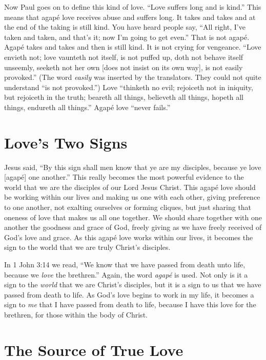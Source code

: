 Now Paul goes on to define this kind of love. “Love suffers long and is kind.” This means that agapé love receives 
abuse and suffers long. It takes and takes and at the end 
of the taking is still kind. You have heard people say, “All 
right, I’ve taken and taken, and that’s it; now I’m going 
to get even.” That is not agapé. Agapé takes and takes 
and then is still kind. It is not crying for vengeance. “Love 
envieth not; love vaunteth not itself, is not puffed up, doth 
not behave itself unseemly, seeketh not her own [does not 
insist on its own way], is not easily provoked.” (The word 
\emph{easily} was inserted by the translators. They could not quite 
understand “is not provoked.”) Love “thinketh no evil; 
rejoiceth not in iniquity, but rejoiceth in the truth; beareth all 
things, believeth all things, hopeth all things, endureth all 
things.” Agapé love “never fails.”


\section*{Love's Two Signs}

Jesus said, “By this sign shall men know that ye are my 
disciples, because ye love [agapé] one another.” This really 
becomes the most powerful evidence to the world that we 
are the disciples of our Lord Jesus Christ. This agapé love 
should be working within our lives and making us one with
each other, giving preference to one another, not exalting 
ourselves or forming cliques, but just sharing that oneness 
of love that makes us all one together. We should share 
together with one another the goodness and grace of God, 
freely giving as we have freely received of God’s love and 
grace. As this agapé love works within our lives, it becomes 
the sign to the world that we are truly Christ’s disciples.

In 1 John 3:14 we read, “We know that we have passed 
from death unto life, because we \emph{love} the brethren.” Again, 
the word \emph{agapé} is used. Not only is it a sign to the \emph{world} that 
we are Christ’s disciples, but it is a sign to us that we have 
passed from death to life. As God’s love begins to work in 
my life, it becomes a sign to  \emph{me} that I have passed from 
death to life, because I have this love for the brethren, for 
those within the body of Christ.


\section*{The Source of True Love}

